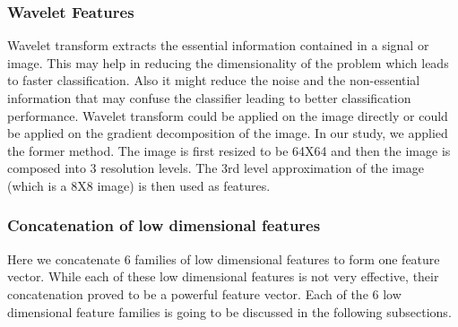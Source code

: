 \documentclass[conference]{IEEEtran}
\begin{document}
\subsubsection {Wavelet Features}
Wavelet transform \cite{gonzales2002} extracts the essential information contained in a signal or image. This may help in reducing the dimensionality of the problem which leads to faster classification. Also it might reduce the noise and the non-essential information that may confuse the classifier leading to better classification performance. Wavelet transform could be applied on the image directly or could be applied on the gradient decomposition of the image. In our study, we applied the former method. The image is first resized to be 64X64 and then the image is composed into 3 resolution levels. The 3rd level approximation of the image (which is a 8X8 image) is then used as features.

\subsubsection {Concatenation of low dimensional features}
\label{sec:conLow}
Here we concatenate 6 families of low dimensional features to form one feature vector. While each of these low dimensional features is not very effective, their concatenation proved to be a powerful feature vector. Each of the 6 low dimensional feature families is going to be discussed in the following subsections.
\end{document}
